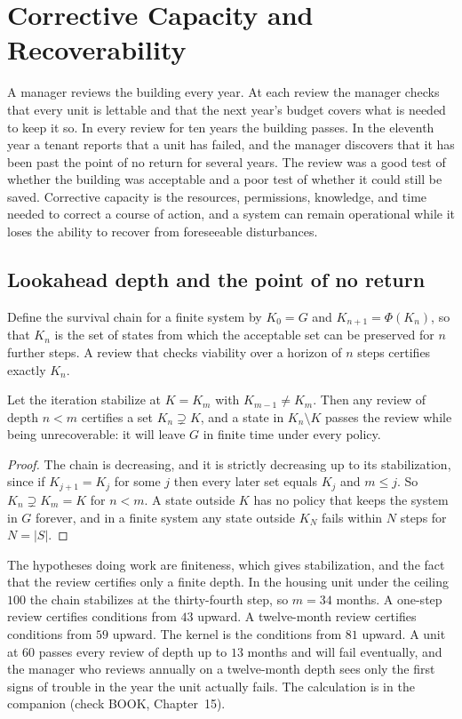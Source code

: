 \chapter{Corrective Capacity and Recoverability}\label{ch:15}

A manager reviews the building every year. At each review the manager checks that every unit is lettable and that the next year's budget covers what is needed to keep it so. In every review for ten years the building passes. In the eleventh year a tenant reports that a unit has failed, and the manager discovers that it has been past the point of no return for several years. The review was a good test of whether the building was acceptable and a poor test of whether it could still be saved. Corrective capacity is the resources, permissions, knowledge, and time needed to correct a course of action, and a system can remain operational while it loses the ability to recover from foreseeable disturbances.

\section{Lookahead depth and the point of no return}

Define the survival chain for a finite system by $K_0=G$ and $K_{n+1}=\Phi(K_n)$, so that $K_n$ is the set of states from which the acceptable set can be preserved for $n$ further steps. A review that checks viability over a horizon of $n$ steps certifies exactly $K_n$.

\begin{theorem}\label{thm:depth}
Let the iteration stabilize at $K=K_m$ with $K_{m-1}\ne K_m$. Then any review of depth $n<m$ certifies a set $K_n\supsetneq K$, and a state in $K_n\setminus K$ passes the review while being unrecoverable: it will leave $G$ in finite time under every policy.
\end{theorem}

\begin{proof}
The chain is decreasing, and it is strictly decreasing up to its stabilization, since if $K_{j+1}=K_j$ for some $j$ then every later set equals $K_j$ and $m\le j$. So $K_n\supsetneq K_m=K$ for $n<m$. A state outside $K$ has no policy that keeps the system in $G$ forever, and in a finite system any state outside $K_N$ fails within $N$ steps for $N=|S|$.
\end{proof}

The hypotheses doing work are finiteness, which gives stabilization, and the fact that the review certifies only a finite depth. In the housing unit under the ceiling $100$ the chain stabilizes at the thirty-fourth step, so $m=34$ months. A one-step review certifies conditions from $43$ upward. A twelve-month review certifies conditions from $59$ upward. The kernel is the conditions from $81$ upward. A unit at $60$ passes every review of depth up to $13$ months and will fail eventually, and the manager who reviews annually on a twelve-month depth sees only the first signs of trouble in the year the unit actually fails. The calculation is in the companion (check BOOK, Chapter~15).

